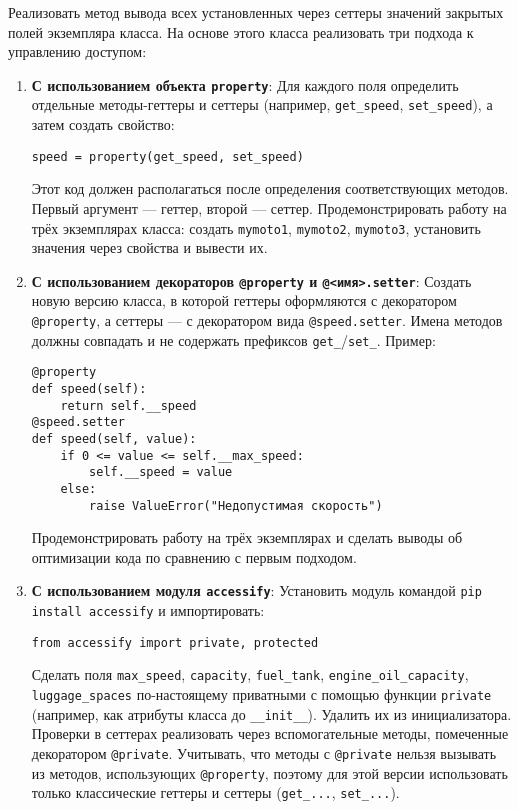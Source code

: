\begin{enumerate}
\begin{itemize}
\end{itemize}
Реализовать метод вывода всех установленных через сеттеры значений закрытых полей экземпляра класса.
На основе этого класса реализовать три подхода к управлению доступом:
\begin{enumerate}
    \item \textbf{С использованием объекта \texttt{property}}:  
    Для каждого поля определить отдельные методы-геттеры и сеттеры (например, \texttt{get\_speed}, \texttt{set\_speed}), а затем создать свойство:  
    \begin{verbatim}
speed = property(get_speed, set_speed)
    \end{verbatim}  
    Этот код должен располагаться после определения соответствующих методов. Первый аргумент — геттер, второй — сеттер.  
    Продемонстрировать работу на трёх экземплярах класса: создать \texttt{mymoto1}, \texttt{mymoto2}, \texttt{mymoto3}, установить значения через свойства и вывести их.
    \item \textbf{С использованием декораторов \texttt{@property} и \texttt{@<имя>.setter}}:  
    Создать новую версию класса, в которой геттеры оформляются с декоратором \texttt{@property}, а сеттеры — с декоратором вида \texttt{@speed.setter}. Имена методов должны совпадать и не содержать префиксов \texttt{get\_}/\texttt{set\_}.  
    Пример:  
    \begin{verbatim}
@property
def speed(self):
    return self.__speed
@speed.setter
def speed(self, value):
    if 0 <= value <= self.__max_speed:
        self.__speed = value
    else:
        raise ValueError("Недопустимая скорость")
    \end{verbatim}  
    Продемонстрировать работу на трёх экземплярах и сделать выводы об оптимизации кода по сравнению с первым подходом.
    \item \textbf{С использованием модуля \texttt{accessify}}:  
    Установить модуль командой \texttt{pip install accessify} и импортировать:  
    \begin{verbatim}
from accessify import private, protected
    \end{verbatim}  
    Сделать поля \texttt{max\_speed}, \texttt{capacity}, \texttt{fuel\_tank}, \texttt{engine\_oil\_capacity}, \texttt{luggage\_spaces} по-настоящему приватными с помощью функции \texttt{private} (например, как атрибуты класса до \texttt{\_\_init\_\_}). Удалить их из инициализатора.  
    Проверки в сеттерах реализовать через вспомогательные методы, помеченные декоратором \texttt{@private}.  
    Учитывать, что методы с \texttt{@private} нельзя вызывать из методов, использующих \texttt{@property}, поэтому для этой версии использовать только классические геттеры и сеттеры (\texttt{get\_...}, \texttt{set\_...}).  

\end{enumerate}
\end{enumerate}

